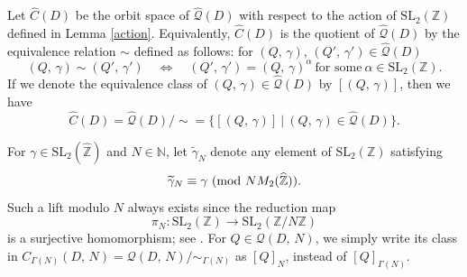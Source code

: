 \documentclass[reqno,11pt]{article}
\newcommand{\Mod}[1]{\ (\textup{mod}\ #1)}
\theoremstyle{plain} %
\theoremstyle{definition} %
\begin{document}
Let $\widehat{C}(D)$ be the orbit space of $\widehat{\mathcal{Q}}(D)$ 
with respect to the action of $\mathrm{SL}_2(\mathbb{Z})$ defined in Lemma \ref{action}.
Equivalently, $\widehat{C}(D)$ is the quotient of
$\widehat{\mathcal{Q}}(D)$ by the equivalence relation $\sim$ defined
as follows: for $(Q,\,\gamma),\,(Q',\,\gamma')\in\widehat{\mathcal{Q}}(D)$
\begin{equation*}
(Q,\,\gamma)\sim(Q',\,\gamma')\quad\Longleftrightarrow\quad
(Q',\,\gamma')=(Q,\,\gamma)^\alpha~\text{for some}~\alpha\in\mathrm{SL}_2(\mathbb{Z}).
\end{equation*}
If we denote the equivalence class of $(Q,\,\gamma)\in\widehat{\mathcal{Q}}(D)$ by $[(Q,\,\gamma)]$,
then we have
\begin{equation*}
\widehat{C}(D)=\widehat{\mathcal{Q}}(D)/\sim=\{[(Q,\,\gamma)]~|~(Q,\,\gamma)\in\widehat{\mathcal{Q}}(D)\}. 
\end{equation*}
\par
For $\gamma\in\mathrm{SL}_2(\widehat{\mathbb{Z}})$
and $N\in\mathbb{N}$, 
let $\widetilde{\gamma}_N$ denote any element of
$\mathrm{SL}_2(\mathbb{Z})$ satisfying
\begin{equation*}
\widetilde{\gamma}_N\equiv\gamma
\Mod{NM_2(\widehat{\mathbb{Z}})}.
\end{equation*}
Such a lift modulo $N$ always exists since the reduction map
\begin{equation*}
\pi_N:\mathrm{SL}_2(\mathbb{Z})
\rightarrow\mathrm{SL}_2(\mathbb{Z}/N\mathbb{Z})
\end{equation*} 
is a surjective homomorphism; see \cite[Lemma 1.38]{Shimura}. 
For $Q\in\mathcal{Q}(D,\,N)$, we simply write its class in 
$C_{\Gamma(N)}(D,\,N)=\mathcal{Q}(D,\,N)/\sim_{\Gamma(N)}$ as
$[Q]_N$, instead of $[Q]_{\Gamma(N)}$. 
\end{document}
